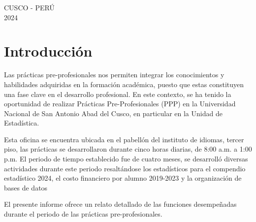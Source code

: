 \documentclass[
  12pt,
  letterpaper,
]{scrreprt}
\renewcommand*\contentsname{Tabla de contenidos}
\newcommand\contentsname{Tabla de contenidos}
\begin{document}
\begin{minipage}[b][\textheight][s]{0.85\textwidth}
{}

\vfill

\centering
\Large{CUSCO - PERÚ} \\
\Large{2024}
\vspace{0.1\textheight} 
\end{minipage}



\pagebreak %


\setlength{\parindent}{1.5em}

\renewcommand*\contentsname{Índice general}
{
\hypersetup{linkcolor=}
\setcounter{tocdepth}{2}
\tableofcontents
}
\listoffigures
{}

\chapter{Introducción}\label{introducciuxf3n}


Las prácticas pre-profesionales nos permiten integrar los conocimientos
y habilidades adquiridas en la formación académica, puesto que estas
constituyen una fase clave en el desarrollo profesional. En este
contexto, se ha tenido la oportunidad de realizar Prácticas
Pre-Profesionales (PPP) en la Universidad Nacional de San Antonio Abad
del Cusco, en particular en la Unidad de Estadística.

Esta oficina se encuentra ubicada en el pabellón del instituto de
idiomas, tercer piso, las prácticas se desarrollaron durante cinco horas
diarias, de 8:00 a.m. a 1:00 p.m. El periodo de tiempo establecido fue
de cuatro meses, se desarrolló diversas actividades durante este periodo
resaltándose los estadísticos para el compendio estadístico 2024, el
costo financiero por alumno 2019-2023 y la organización de bases de
datos

El presente informe ofrece un relato detallado de las funciones
desempeñadas durante el periodo de las prácticas pre-profesionales.
\end{document}
